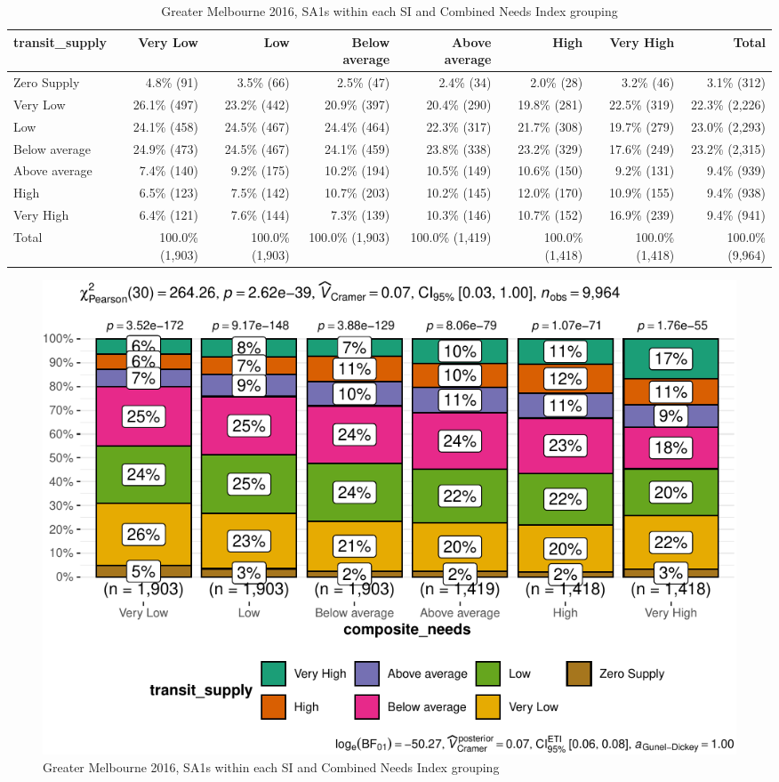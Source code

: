 \documentclass[preprint, 3p,
authoryear]{elsarticle} %
\begin{document}
\begin{table}

\caption{\label{tab:Greater_Melbourne_2016_needs_gap_zones}Greater Melbourne 2016, SA1s within each SI and Combined Needs Index grouping}
\centering
\fontsize{7}{9}\selectfont
\begin{tabular}[t]{l|r|r|r|r|r|r|r}
\hline
transit\_supply & Very Low & Low & Below average & Above average & High & Very High & Total\\
\hline
Zero Supply & 4.8\%    (91) & 3.5\%    (66) & 2.5\%    (47) & 2.4\%    (34) & 2.0\%    (28) & 3.2\%    (46) & 3.1\%   (312)\\
\hline
Very Low & 26.1\%   (497) & 23.2\%   (442) & 20.9\%   (397) & 20.4\%   (290) & 19.8\%   (281) & 22.5\%   (319) & 22.3\% (2,226)\\
\hline
Low & 24.1\%   (458) & 24.5\%   (467) & 24.4\%   (464) & 22.3\%   (317) & 21.7\%   (308) & 19.7\%   (279) & 23.0\% (2,293)\\
\hline
Below average & 24.9\%   (473) & 24.5\%   (467) & 24.1\%   (459) & 23.8\%   (338) & 23.2\%   (329) & 17.6\%   (249) & 23.2\% (2,315)\\
\hline
Above average & 7.4\%   (140) & 9.2\%   (175) & 10.2\%   (194) & 10.5\%   (149) & 10.6\%   (150) & 9.2\%   (131) & 9.4\%   (939)\\
\hline
High & 6.5\%   (123) & 7.5\%   (142) & 10.7\%   (203) & 10.2\%   (145) & 12.0\%   (170) & 10.9\%   (155) & 9.4\%   (938)\\
\hline
Very High & 6.4\%   (121) & 7.6\%   (144) & 7.3\%   (139) & 10.3\%   (146) & 10.7\%   (152) & 16.9\%   (239) & 9.4\%   (941)\\
\hline
Total & 100.0\% (1,903) & 100.0\% (1,903) & 100.0\% (1,903) & 100.0\% (1,419) & 100.0\% (1,418) & 100.0\% (1,418) & 100.0\% (9,964)\\
\hline
\end{tabular}
\end{table}

\begin{figure}
\centering
\includegraphics{Leveraging_GTFS_to_assess_transit_supply_Transport_Geography_files/figure-latex/Greater_Melbourne_2016_needs_gap_zones-1.pdf}
\caption{Greater Melbourne 2016, SA1s within each SI and Combined Needs
Index grouping}
\end{figure}
\end{document}
